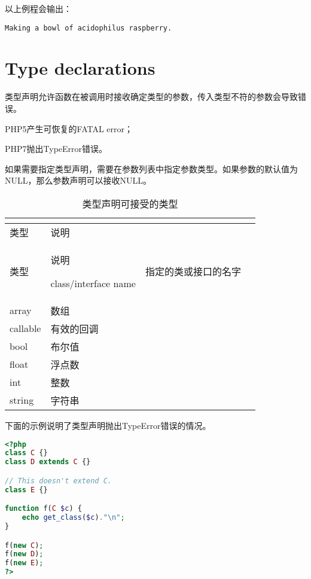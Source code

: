 以上例程会输出：

\begin{verbatim}
Making a bowl of acidophilus raspberry.
\end{verbatim}


\section{Type declarations}

类型声明允许函数在被调用时接收确定类型的参数，传入类型不符的参数会导致错误。

\begin{compactitem}
\item PHP5产生可恢复的FATAL error；
\item PHP7抛出TypeError错误。
\end{compactitem}

如果需要指定类型声明，需要在参数列表中指定参数类型。如果参数的默认值为NULL，那么参数声明可以接收NULL。


\begin{longtable}{|m{80pt}|m{250pt}|}
\tabularnewline\hline
类型&说明
\endhead

\caption{类型声明可接受的类型}\\
\hline
类型&说明
\endfirsthead

\endfoot

\endlastfoot

\hline
class/interface name & 指定的类或接口的名字\\
\hline
array & 数组\\
\hline
callable & 有效的回调\\
\hline
bool & 布尔值\\
\hline
float & 浮点数\\
\hline
int & 整数\\
\hline
string & 字符串\\
\hline
\end{longtable}

下面的示例说明了类型声明抛出TypeError错误的情况。

\begin{lstlisting}[language=PHP]
<?php
class C {}
class D extends C {}

// This doesn't extend C.
class E {}

function f(C $c) {
    echo get_class($c)."\n";
}

f(new C);
f(new D);
f(new E);
?>
\end{lstlisting}


